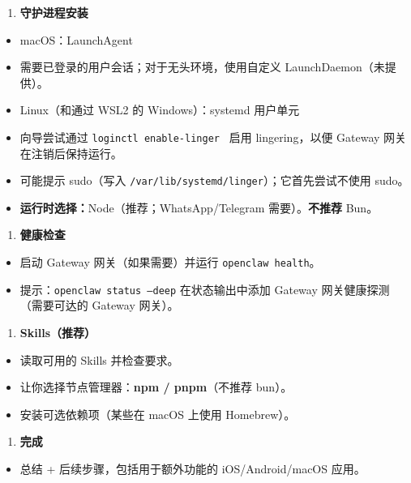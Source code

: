 \begin{enumerate}
  \item \textbf{守护进程安装}
\end{enumerate}

\begin{itemize}
  \item macOS：LaunchAgent
  \item 需要已登录的用户会话；对于无头环境，使用自定义 LaunchDaemon（未提供）。
  \item Linux（和通过 WSL2 的 Windows）：systemd 用户单元
  \item 向导尝试通过 \texttt{loginctl enable-linger } 启用 lingering，以便 Gateway 网关在注销后保持运行。
  \item 可能提示 sudo（写入 \texttt{/var/lib/systemd/linger}）；它首先尝试不使用 sudo。
  \item \textbf{运行时选择：}Node（推荐；WhatsApp/Telegram 需要）。\textbf{不推荐} Bun。
\end{itemize}


\begin{enumerate}
  \item \textbf{健康检查}
\end{enumerate}

\begin{itemize}
  \item 启动 Gateway 网关（如果需要）并运行 \texttt{openclaw health}。
  \item 提示：\texttt{openclaw status --deep} 在状态输出中添加 Gateway 网关健康探测（需要可达的 Gateway 网关）。
\end{itemize}


\begin{enumerate}
  \item \textbf{Skills（推荐）}
\end{enumerate}

\begin{itemize}
  \item 读取可用的 Skills 并检查要求。
  \item 让你选择节点管理器：\textbf{npm / pnpm}（不推荐 bun）。
  \item 安装可选依赖项（某些在 macOS 上使用 Homebrew）。
\end{itemize}


\begin{enumerate}
  \item \textbf{完成}
\end{enumerate}

\begin{itemize}
  \item 总结 + 后续步骤，包括用于额外功能的 iOS/Android/macOS 应用。
\end{itemize}


